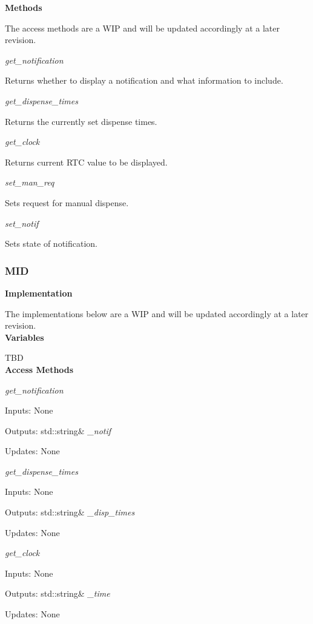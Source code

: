 \documentclass[12pt,titlepage]{article}
\begin{document}
\noindent \textbf{Methods}

\noindent The access methods are a WIP and will be updated accordingly at a later revision.

\textit{get\_notification}


Returns whether to display a notification and what information to include.

\textit{get\_dispense\_times}

Returns the currently set dispense times.

\textit{get\_clock}

Returns current RTC value to be displayed.

\textit{set\_man\_req}

Sets request for manual dispense.

\textit{set\_notif}

Sets state of notification.

\subsubsection*{MID}

\noindent \textbf{Implementation} 

\noindent The implementations below are a WIP and will be updated accordingly at a later revision.\\

\noindent \textbf{Variables}

TBD \\

\noindent \textbf{Access Methods} \par

\textit{get\_notification} \par
Inputs: None \par
Outputs: std::string& \textit{\_notif} \par
Updates: None  \newline

\textit{get\_dispense\_times} \par
Inputs: None \par
Outputs: std::string& \textit{\_disp\_times} \par
Updates: None \newline

\textit{get\_clock} \par
Inputs: None \par
Outputs: std::string& \textit{\_time} \par
Updates: None \newline
\end{document}
